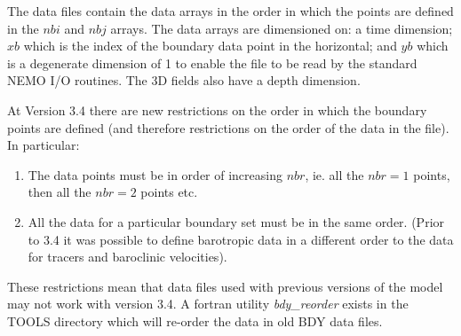 The data files contain the data arrays
in the order in which the points are defined in the $nbi$ and $nbj$
arrays. The data arrays are dimensioned on: a time dimension;
$xb$ which is the index of the boundary data point in the horizontal;
and $yb$ which is a degenerate dimension of 1 to enable the file to be
read by the standard NEMO I/O routines. The 3D fields also have a
depth dimension. 

At Version 3.4 there are new restrictions on the order in which the
boundary points are defined (and therefore restrictions on the order
of the data in the file). In particular:

\mbox{}

\begin{enumerate}
\item The data points must be in order of increasing $nbr$, ie. all
  the $nbr=1$ points, then all the $nbr=2$ points etc.
\item All the data for a particular boundary set must be in the same
  order. (Prior to 3.4 it was possible to define barotropic data in a
  different order to the data for tracers and baroclinic velocities). 
\end{enumerate}

\mbox{}

These restrictions mean that data files used with previous versions of
the model may not work with version 3.4. A fortran utility
{\it bdy\_reorder} exists in the TOOLS directory which will re-order the
data in old BDY data files. 

